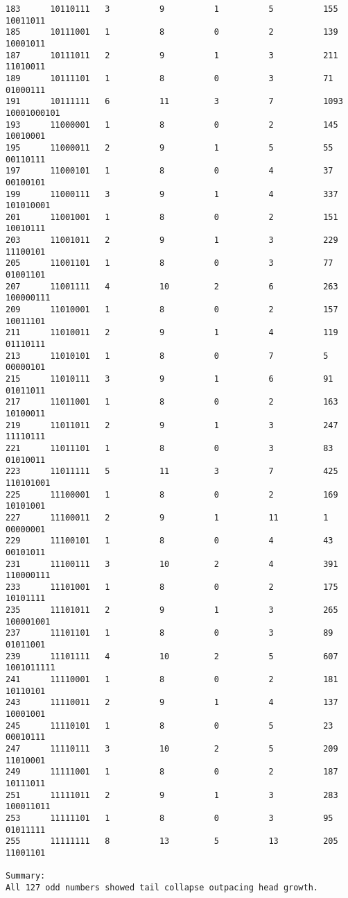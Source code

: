 \documentclass[10pt,letterpaper]{article}
\begin{document}
\begin{lstlisting}
183      10110111   3          9          1          5          155      10011011  
185      10111001   1          8          0          2          139      10001011  
187      10111011   2          9          1          3          211      11010011  
189      10111101   1          8          0          3          71       01000111  
191      10111111   6          11         3          7          1093     10001000101
193      11000001   1          8          0          2          145      10010001  
195      11000011   2          9          1          5          55       00110111  
197      11000101   1          8          0          4          37       00100101  
199      11000111   3          9          1          4          337      101010001 
201      11001001   1          8          0          2          151      10010111  
203      11001011   2          9          1          3          229      11100101  
205      11001101   1          8          0          3          77       01001101  
207      11001111   4          10         2          6          263      100000111 
209      11010001   1          8          0          2          157      10011101  
211      11010011   2          9          1          4          119      01110111  
213      11010101   1          8          0          7          5        00000101  
215      11010111   3          9          1          6          91       01011011  
217      11011001   1          8          0          2          163      10100011  
219      11011011   2          9          1          3          247      11110111  
221      11011101   1          8          0          3          83       01010011  
223      11011111   5          11         3          7          425      110101001 
225      11100001   1          8          0          2          169      10101001  
227      11100011   2          9          1          11         1        00000001  
229      11100101   1          8          0          4          43       00101011  
231      11100111   3          10         2          4          391      110000111 
233      11101001   1          8          0          2          175      10101111  
235      11101011   2          9          1          3          265      100001001 
237      11101101   1          8          0          3          89       01011001  
239      11101111   4          10         2          5          607      1001011111
241      11110001   1          8          0          2          181      10110101  
243      11110011   2          9          1          4          137      10001001  
245      11110101   1          8          0          5          23       00010111  
247      11110111   3          10         2          5          209      11010001  
249      11111001   1          8          0          2          187      10111011  
251      11111011   2          9          1          3          283      100011011 
253      11111101   1          8          0          3          95       01011111  
255      11111111   8          13         5          13         205      11001101  

Summary:
All 127 odd numbers showed tail collapse outpacing head growth.

\end{lstlisting}
\end{document}

